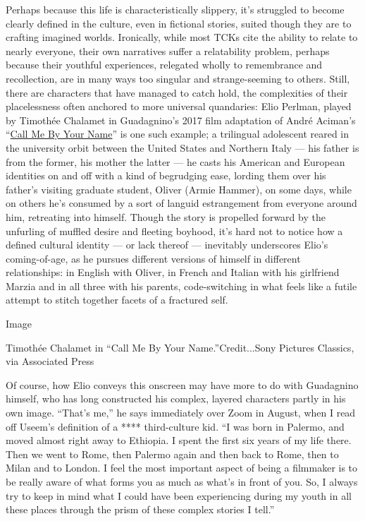 Perhaps because this life is characteristically slippery, it's struggled
to become clearly defined in the culture, even in fictional stories,
suited though they are to crafting imagined worlds. Ironically, while
most TCKs cite the ability to relate to nearly everyone, their own
narratives suffer a relatability problem, perhaps because their youthful
experiences, relegated wholly to remembrance and recollection, are in
many ways too singular and strange-seeming to others. Still, there are
characters that have managed to catch hold, the complexities of their
placelessness often anchored to more universal quandaries: Elio Perlman,
played by Timothée Chalamet in Guadagnino's 2017 film adaptation of
André Aciman's
``\href{https://www.nytimes3xbfgragh.onion/2017/11/22/movies/call-me-by-your-name-review-armie-hammer.html}{Call
Me By Your Name}'' is one such example; a trilingual adolescent reared
in the university orbit between the United States and Northern Italy ---
his father is from the former, his mother the latter --- he casts his
American and European identities on and off with a kind of begrudging
ease, lording them over his father's visiting graduate student, Oliver
(Armie Hammer), on some days, while on others he's consumed by a sort of
languid estrangement from everyone around him, retreating into himself.
Though the story is propelled forward by the unfurling of muffled desire
and fleeting boyhood, it's hard not to notice how a defined cultural
identity --- or lack thereof --- inevitably underscores Elio's
coming-of-age, as he pursues different versions of himself in different
relationships: in English with Oliver, in French and Italian with his
girlfriend Marzia and in all three with his parents, code-switching in
what feels like a futile attempt to stitch together facets of a
fractured self.

Image

Timothée Chalamet in ``Call Me By Your Name.''Credit...Sony Pictures
Classics, via Associated Press

Of course, how Elio conveys this onscreen may have more to do with
Guadagnino himself, who has long constructed his complex, layered
characters partly in his own image. ``That's me,'' he says immediately
over Zoom in August, when I read off Useem's definition of a ****
third-culture kid. ``I was born in Palermo, and moved almost right away
to Ethiopia. I spent the first six years of my life there. Then we went
to Rome, then Palermo again and then back to Rome, then to Milan and to
London. I feel the most important aspect of being a filmmaker is to be
really aware of what forms you as much as what's in front of you. So, I
always try to keep in mind what I could have been experiencing during my
youth in all these places through the prism of these complex stories I
tell.''

